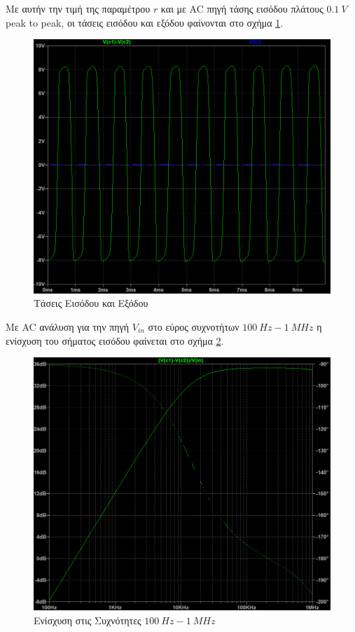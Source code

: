 \documentclass[11pt,a4paper,twoside,onecolumn,openright,final]{memoir}
\begin{document}
Με αυτήν την τιμή της παραμέτρου \(r\) και με AC πηγή τάσης εισόδου πλάτους \(0.1 \ V\) peak to peak, οι τάσεις εισόδου και εξόδου φαίνονται στο σχήμα \ref{fig:ex1plot4}.

\begin{figure}[h]
\centerfloat%
\includegraphics[width=12.0cm]{figures/exercise1plot4.png}
\caption{Τάσεις Εισόδου και Εξόδου}\label{fig:ex1plot4}
\end{figure}

Με AC ανάλυση για την πηγή \(V_{in}\) στο εύρος συχνοτήτων \(100 \ Hz - 1\ MHz\) η ενίσχυση του σήματος εισόδου φαίνεται στο σχήμα \ref{fig:ex1plot5}.

\begin{figure}[h]
\centerfloat%
\includegraphics[width=12.0cm]{figures/exercise1plot5.png}
\caption{Ενίσχυση στις Συχνότητες \(100 \ Hz - 1 \ M Hz\)}\label{fig:ex1plot5}
\end{figure}
\end{document}
